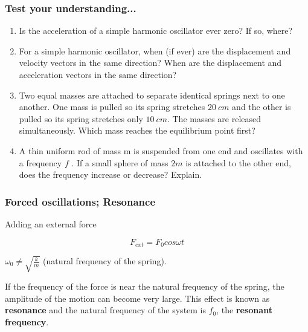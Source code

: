 \documentclass[]{beamer}
\begin{document}
\begin{frame}
\frametitle{Test your understanding...}


\begin{enumerate}
\item Is the acceleration of a simple harmonic oscillator ever zero? If so, where?
\pause
\item For a simple harmonic oscillator, when (if ever) are the
displacement and velocity vectors in the same direction?
When are the displacement and acceleration vectors in the
same direction?
\pause
\item Two equal masses are attached to separate identical springs
next to one another. One mass is pulled so its spring
stretches $20~cm$ and the other is pulled so its spring stretches
only $10~cm$. The masses are released simultaneously. Which
mass reaches the equilibrium point first?
\pause
\item A thin uniform rod of mass m is suspended from one end
and oscillates with a frequency $f$ . If a small sphere of mass
$2m$ is attached to the other end, does the frequency increase
or decrease? Explain.

\end{enumerate}



\end{frame}


\begin{frame}
\frametitle{ Forced oscillations; Resonance}


Adding an  external force 

\pause

 \begin{equation}
F_{ext}=F_0cos\omega t
\end{equation}

\pause

$\omega_0\neq\sqrt{\frac{k}{m}}$ (natural frequency of the spring).

\vspace{5mm}

\textcolor{mypink1}{If the frequency of the force is near the natural frequency of the spring, the amplitude of the motion can become very large. 
This effect is known as \textbf{resonance} and the natural frequency of
the system is $f_0$, the \textbf{resonant frequency}. }

\end{frame}
\end{document}
